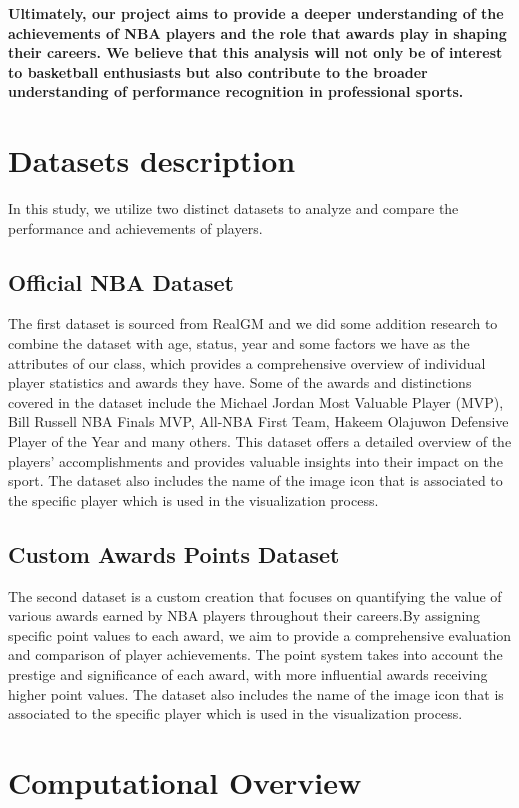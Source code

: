 \documentclass[fontsize=11pt]{article}
\begin{document}
\textbf{Ultimately, our project aims to provide a deeper understanding of the achievements of NBA players and the role that awards play in shaping their careers. We believe that this analysis will not only be of interest to basketball enthusiasts but also contribute to the broader understanding of performance recognition in professional sports.}

\section{Datasets description}
In this study, we utilize two distinct datasets to analyze and compare the performance and achievements of players.
\subsection{Official NBA Dataset}
The first dataset is sourced from RealGM and we did some addition research to combine the dataset with age, status, year and some factors we have as the attributes of our class, which provides a comprehensive overview of individual player statistics and awards they have. Some of the awards and distinctions covered in the dataset include the Michael Jordan Most Valuable Player (MVP), Bill Russell NBA Finals MVP, All-NBA First Team, Hakeem Olajuwon Defensive Player of the Year and many others. This dataset offers a detailed overview of the players' accomplishments and provides valuable insights into their impact on the sport. The dataset also includes the name of the image icon that is associated to the specific player which is used in the visualization process.
\subsection{Custom Awards Points Dataset}
The second dataset is a custom creation that focuses on quantifying the value of various awards earned by NBA players throughout their careers.By assigning specific point values to each award, we aim to provide a comprehensive evaluation and comparison of player achievements. The point system takes into account the prestige and significance of each award, with more influential awards receiving higher point values.  The dataset also includes the name of the image icon that is associated to the specific player which is used in the visualization process.

\section{Computational Overview}
\end{document}
